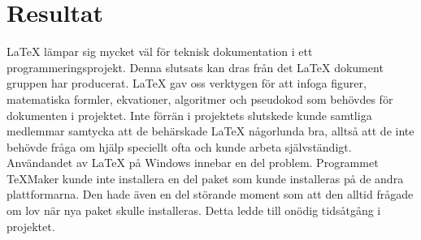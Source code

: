 \section{Resultat}
{\LaTeX} lämpar sig mycket väl för teknisk dokumentation i ett programmeringsprojekt. Denna slutsats kan dras från det {\LaTeX} dokument gruppen har producerat. {\LaTeX} gav oss verktygen för att infoga figurer, matematiska formler, ekvationer, algoritmer och pseudokod som behövdes för dokumenten i projektet.
\newline
\newline
Inte förrän i projektets slutskede kunde samtliga medlemmar samtycka att de behärskade {\LaTeX} någorlunda bra, alltså att de inte behövde fråga om hjälp speciellt ofta och kunde arbeta självständigt.  
\newline
\newline
Användandet av {\LaTeX} på Windows innebar en del problem. Programmet TeXMaker kunde inte installera en del paket som kunde installeras på de andra plattformarna. Den hade även en del störande moment som att den alltid frågade om lov när nya paket skulle installeras. Detta ledde till onödig tidsåtgång i projektet. 
